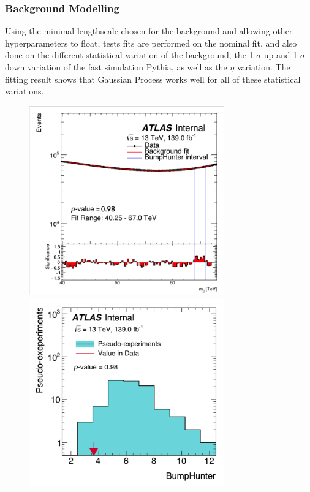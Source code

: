 \subsubsection{Background Modelling}
Using the minimal lengthscale chosen for the background and allowing other hyperparameters to float, tests fits are performed on the nominal fit, and also done on the different statistical variation of the background, the 1 $\sigma$ up and 1 $\sigma$ down variation of the fast simulation Pythia, as well as the $\eta$ variation.
The fitting result shows that Gaussian Process works well for all of these statistical variations. 

\begin{figure}[!htb]
    \begin{center}
        \includegraphics[width=0.75\textwidth]{figures/chapter_dimuon/Nominal}        
        \includegraphics[width=0.75\textwidth]{figures/chapter_dimuon/NominalBH}        

\end{center}
\end{figure}
